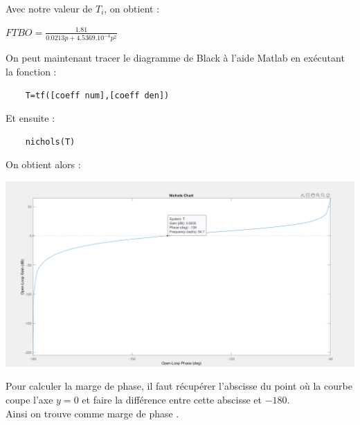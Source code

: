\documentclass[12pt]{article}
\begin{document}
\normalsize Avec notre valeur de $T_i$, on obtient :
\begin{center}
    \large$FTBO = \frac{1.81}{0.0213p + 4.5369.10^{-4}p^2}$
\end{center}
\normalsize On peut maintenant tracer le diagramme de Black à l'aide Matlab en exécutant la fonction :
\begin{verbatim}
    T=tf([coeff num],[coeff den]) 
\end{verbatim}
Et ensuite :
\begin{verbatim}
    nichols(T)
\end{verbatim}
On obtient alors : 
\begin{center}
    \includegraphics[width = 16 cm]{TP2 Simulink/Syst_1/Ti=tau_syst_1_Black.png}
\end{center}
Pour calculer la marge de phase, il faut récupérer l'abscisse du point où la courbe coupe l'axe $y=0$ et faire la différence entre cette abscisse et $-180$.
\\Ainsi on trouve comme marge de phase .
\end{document}
